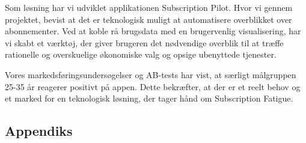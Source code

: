\documentclass[12pt]{article}
\begin{document}
    Som løsning har vi udviklet applikationen Subscription Pilot. Hvor vi gennem projektet, bevist at det er teknologisk muligt at automatisere overblikket over abonnementer. Ved at koble rå brugsdata med en brugervenlig visualisering, har vi skabt et værktøj, der giver brugeren det nødvendige overblik til at træffe rationelle og overskuelige økonomiske valg og opsige ubenyttede tjenester.

    Vores markedsføringsundersøgelser og AB-tests har vist, at særligt målgruppen 25-35 år reagerer positivt på appen. Dette bekræfter, at der er et reelt behov og et marked for en teknologisk løsning, der tager hånd om Subscription Fatigue.


    \newpage
    \nocite{*}
    \printbibliography[heading=bibintoc,title={Litteraturliste}]

     \newpage
     \begin{appendices}
        \section{Appendiks}
        
    \end{appendices}
\end{document}
